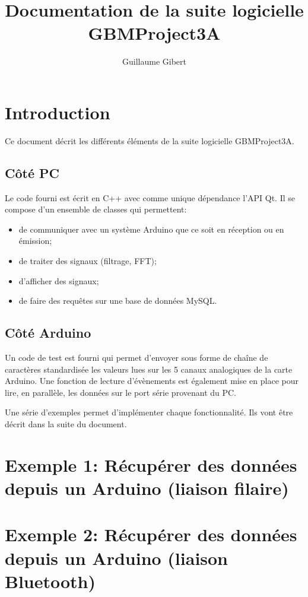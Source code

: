\documentclass{article}
\begin{document}
\title{Documentation de la suite logicielle GBMProject3A}
\author{Guillaume Gibert}
\maketitle

\section{Introduction}
Ce document décrit les différents éléments de la suite logicielle GBMProject3A.

\subsection{Côté PC}
Le code fourni est écrit en C++ avec comme unique dépendance l'API Qt.
Il se compose d'un ensemble de classes qui permettent:
\begin{itemize}
\item de communiquer avec un système Arduino que ce soit en réception ou en émission;
\item de traiter des signaux (filtrage, FFT);
\item d'afficher des signaux;
\item de faire des requêtes sur une base de données MySQL.
\end{itemize}

\subsection{Côté Arduino}
Un code de test est fourni qui permet d'envoyer sous forme de chaîne de caractères standardisée les valeurs lues sur les 5 canaux analogiques de la carte Arduino. Une fonction de lecture d'évènements est également mise en place pour lire, en parallèle, les données sur le port série provenant du PC.


Une série d'exemples permet d'implémenter chaque fonctionnalité. Ils vont être décrit dans la suite du document.

\section{Exemple 1: Récupérer des données depuis un Arduino (liaison filaire)}

\section{Exemple 2: Récupérer des données depuis un Arduino (liaison Bluetooth)}
\end{document}
